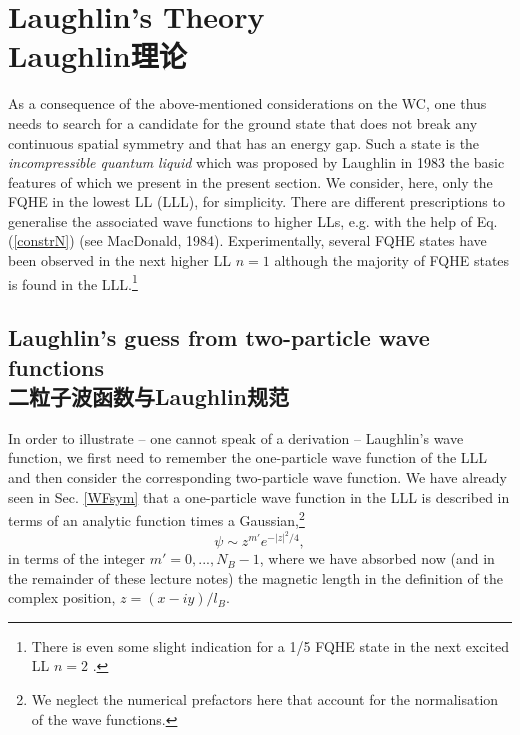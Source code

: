 \documentclass[10pt]{book}
\begin{document}
\section[Laughlin理论]{Laughlin's Theory\\\bf Laughlin理论}
\label{FQHE1}





As a consequence of the above-mentioned considerations on the WC, one thus needs to search for a candidate for the ground state
that does not break any continuous spatial symmetry and that has an energy gap. Such a state is the {\sl incompressible quantum 
liquid} which was proposed by Laughlin in 1983 \cite{laughlin} the basic features of which we present in the present section.
We consider, here, only the FQHE in the lowest LL (LLL), for simplicity. There are different prescriptions to generalise 
the associated wave functions to higher LLs, e.g. with the help of Eq. (\ref{constrN}) (see MacDonald, 1984).
Experimentally, several FQHE states have been observed in the next higher LL $n=1$ although the majority of FQHE states
is found in the LLL.\footnote{There is even some slight indication for a 1/5 FQHE state in the next excited LL $n=2$
\cite{gervais}.}


\subsection[二粒子波函数与Laughlin规范]{Laughlin's guess from two-particle wave functions\\\bf 二粒子波函数与Laughlin规范}

In order to illustrate -- one cannot speak of a derivation -- Laughlin's wave function, we first need to remember the 
one-particle wave function of the LLL and then consider the corresponding two-particle wave function. We have already seen
in Sec. \ref{WFsym} that a one-particle wave function in the LLL is described in terms of an analytic function times a
Gaussian,\footnote{We neglect the numerical prefactors here that account for the normalisation of the wave functions.}
$$
\psi \sim z^{m'} e^{-|z|^2/4},
$$
in terms of the integer $m'=0, ..., N_{B}-1$, 
where we have absorbed now (and in the remainder of these lecture notes) the magnetic length in the definition of the complex
position, $z=(x-iy)/l_B$. 
\end{document}
